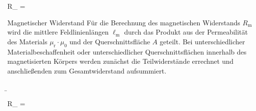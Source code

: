 \begin{frame}
{		\begin{eq}
			R_{} = \qquad{}\label{GlmagnWiderstand}
		\end{eq}
		
		\begin{Merksatz}{Magnetischer Widerstand}
			Für die Berechnung des magnetischen Widerstands $R_{\mathrm{m}}$ wird die mittlere Feldlinienlängen ${\ell_{\mathrm{m}}}$ durch das Produkt aus der Permeabilität des Materials ${\mu_{\mathrm{r}}\cdot\mu_0}$ und der Querschnittsfläche $A$ geteilt. Bei unterschiedlicher Materialbeschaffenheit oder unterschiedlicher Querschnittsflächen innerhalb des magnetisierten Körpers werden zunächst die Teilwiderstände errechnet und anschließenden zum Gesamtwiderstand aufsummiert.
		\end{Merksatz}
	}
	\pause	
	
	\b{
		\begin{minipage}{0.5\textwidth}
			\v{
		\onslide<2->{
				\begin{eq}
					R_{\mathrm{m}} \qquad\left[\frac{\mathrm{A}}{\mathrm{V} \cdot \mathrm{s}}\right]
				\end{eq}
		}
		\pause	
		\pause
	}%
			\begin{eq}
				R_{} = \qquad{}
			\end{eq}
		\end{minipage}
	}%
	

\end{frame}
